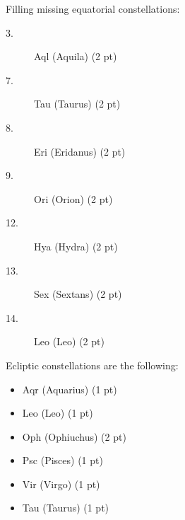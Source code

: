 Filling missing equatorial constellations:
\begin{description}
\item[3.] Aql (Aquila) \hfill(2 pt)
\item[7.] Tau (Taurus) \hfill(2 pt)
\item[8.] Eri (Eridanus) \hfill(2 pt)
\item[9.] Ori (Orion) \hfill(2 pt)
\item[12.] Hya (Hydra) \hfill(2 pt)
\item[13.] Sex (Sextans) \hfill(2 pt)
\item[14.] Leo (Leo) \hfill(2 pt)
\end{description}

Ecliptic constellations are the following:
\begin{itemize}
\item Aqr (Aquarius) \hfill(1 pt)
\item Leo (Leo) \hfill(1 pt)
\item Oph (Ophiuchus) \hfill(2 pt)
\item Psc (Pisces) \hfill(1 pt)
\item Vir (Virgo) \hfill(1 pt)
\item Tau (Taurus) \hfill(1 pt)
\end{itemize}
